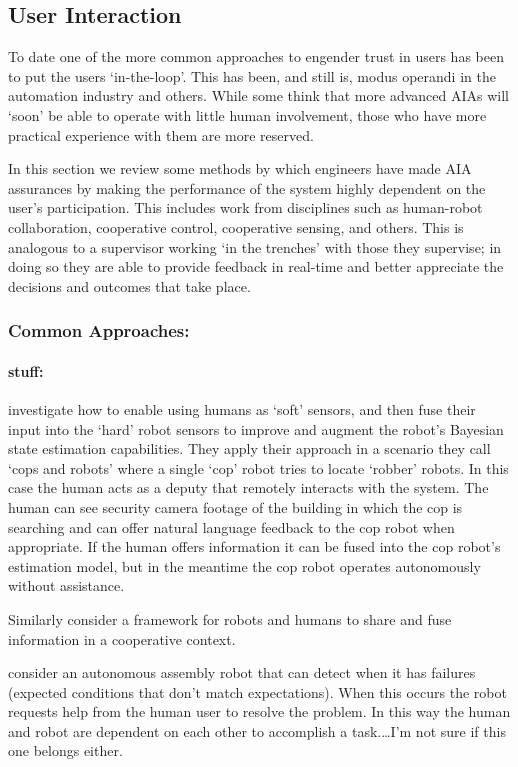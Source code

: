 \subsection{User Interaction} \label{sec:user_interaction}
To date one of the more common approaches to engender trust in users has been to put the users `in-the-loop'. This has been, and still is, modus operandi in the automation industry and others. While some think that more advanced AIAs will `soon' be able to operate with little human involvement, those who have more practical experience with them are more reserved.

In this section we review some methods by which engineers have made AIA assurances by making the performance of the system highly dependent on the user's participation. This includes work from disciplines such as human-robot collaboration, cooperative control, cooperative sensing, and others. This is analogous to a supervisor working `in the trenches' with those they supervise; in doing so they are able to provide feedback in real-time and better appreciate the decisions and outcomes that take place.

\subsubsection{Common Approaches:}

\paragraph{stuff:}
\citet{Sweet2016-dw} investigate how to enable using humans as `soft' sensors, and then fuse their input into the `hard' robot sensors to improve and augment the robot's Bayesian state estimation capabilities. They apply their approach in a scenario they call `cops and robots' where a single `cop' robot tries to locate `robber' robots. In this case the human acts as a deputy that remotely interacts with the system. The human can see security camera footage of the building in which the cop is searching and can offer natural language feedback to the cop robot when appropriate. If the human offers information it can be fused into the cop robot's estimation model, but in the meantime the cop robot operates autonomously without assistance.

Similarly \citet{Tse2015-tz} consider a framework for robots and humans to share and fuse information in a cooperative context.

\citet{Tellex2014-uc} consider an autonomous assembly robot that can detect when it has failures (expected conditions that don't match expectations). When this occurs the robot requests help from the human user to resolve the problem. In this way the human and robot are dependent on each other to accomplish a task.\ldots I'm not sure if this one belongs either.

